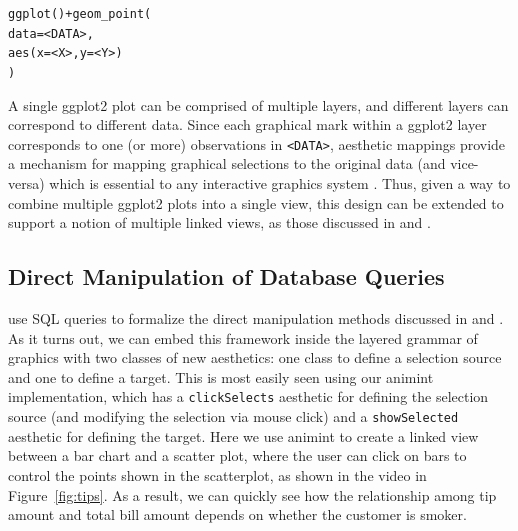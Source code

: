 \documentclass[journal]{vgtc}\usepackage[]{graphicx}\usepackage[]{color}
\makeatletter
\newcommand{\hlkwd}[1]{\textcolor[rgb]{0,0,0}{#1}}%
\newenvironment{kframe}{%
 \def\at@end@of@kframe{}%
 \ifinner\ifhmode%
  \def\at@end@of@kframe{\end{minipage}}%
  \begin{minipage}{\columnwidth}%
 \fi\fi%
 \def\FrameCommand##1{\hskip\@totalleftmargin \hskip-\fboxsep
 \colorbox{shadecolor}{##1}\hskip-\fboxsep
     \hskip-\linewidth \hskip-\@totalleftmargin \hskip\columnwidth}%
 \MakeFramed {\advance\hsize-\width
   \@totalleftmargin\z@ \linewidth\hsize
   \@setminipage}}%
 {\par\unskip\endMakeFramed%
 \at@end@of@kframe}
\newenvironment{knitrout}{}{} %
\makeatother
\begin{document}
\begin{knitrout}
\color{fgcolor}\begin{kframe}
\begin{alltt}
\hlkwd{ggplot}() + \hlkwd{geom_point}(
  data = <DATA>, 
  \hlkwd{aes}(x = <X>, y = <Y>)
)
\end{alltt}
\end{kframe}
\end{knitrout}

A single ggplot2 plot can be comprised of multiple layers, and different layers can correspond to different data. Since each graphical mark within a ggplot2 layer corresponds to one (or more) observations in \texttt{<DATA>}, aesthetic mappings provide a mechanism for mapping graphical selections to the original data (and vice-versa) which is essential to any interactive graphics system \citep{viewing-pipeline, plumbing}. Thus, given a way to combine multiple ggplot2 plots into a single view, this design can be extended to support a notion of multiple linked views, as those discussed in \citep{Ahlberg:1991} and \citep{Buja:1991vh}.

\subsection{Direct Manipulation of Database Queries}

\citet{ggobi:2007} use SQL queries to formalize the direct manipulation methods discussed in \citet{Ahlberg:1991} and \citet{Buja:1991vh}. As it turns out, we can embed this framework inside the layered grammar of graphics with two classes of new aesthetics: one class to define a selection source and one to define a target. This is most easily seen using our animint implementation, which has a \texttt{clickSelects} aesthetic for defining the selection source (and modifying the selection via mouse click) and a \texttt{showSelected} aesthetic for defining the target. Here we use animint to create a linked view between a bar chart and a scatter plot, where the user can click on bars to control the points shown in the scatterplot, as shown in the video in Figure~\ref{fig:tips}. As a result, we can quickly see how the relationship among tip amount and total bill amount depends on whether the customer is smoker.
\end{document}
